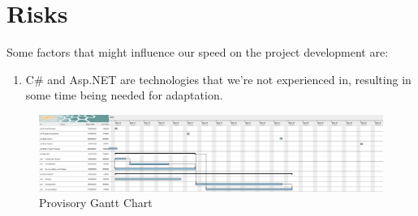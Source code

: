 \documentclass[a4paper,11pt]{article}
\begin{document}
\section{Risks}
Some factors that might influence our speed on the project development are:
\begin{enumerate}
	\item C\# \cite{csharp} and Asp.NET are technologies that we’re not experienced in, resulting in some time being needed for adaptation.
\end{enumerate}

\begin{figure}
\centering
\includegraphics[width=\textwidth,height=\textheight,keepaspectratio]{gantt.png}
\caption{Provisory Gantt Chart}
\end{figure}

\printbibliography[heading=bibintoc]
\end{document}
